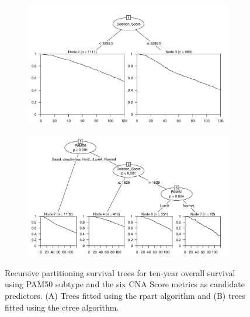 \begin{figure}[!htb]
\centering

\vspace{0.5cm}

\begin{subfigure}{\textwidth}
\subcaption{}
\includegraphics[width=1\textwidth]{../figures/Appendices/Appendix_B/PartyKit_Survival_Score_TenYearOS_PAM50.png}
\end{subfigure}

\vspace{2cm}

\begin{subfigure}{\textwidth}
\subcaption{}
\includegraphics[width=1\textwidth]{../figures/Appendices/Appendix_B/Ctree_Survival_Score_TenYearOS_PAM50.png}
\end{subfigure}

\vspace{0.5cm}

\caption[Recursive partitioning survival trees for ten-year overall survival using PAM50 subtype and the six CNA Score metrics as candidate predictors.]{Recursive partitioning survival trees for ten-year overall survival using PAM50 subtype and the six CNA Score metrics as candidate predictors. (A) Trees fitted using the rpart algorithm and (B) trees fitted using the ctree algorithm.}
\end{figure}

